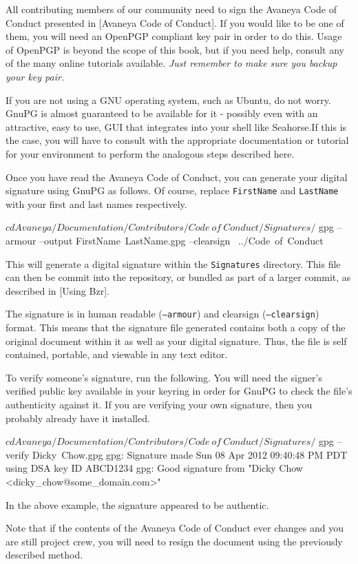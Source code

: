 

All contributing members of our community need to sign the Avaneya Code of Conduct presented in [Avaneya Code of Conduct]. If you would like to be one of them, you will need an OpenPGP compliant key pair in order to do this. Usage of OpenPGP is beyond the scope of this book, but if you need help, consult any of the many online tutorials available. {\it Just remember to make sure you backup your key pair.}

If you are not using a GNU operating system, such as Ubuntu, do not worry. GnuPG is almost guaranteed to be available for it - possibly even with an attractive, easy to use, GUI that integrates into your shell like Seahorse.\footnotecite[seahorse] If this is the case, you will have to consult with the appropriate documentation or tutorial for your environment to perform the analogous steps described here.

Once you have read the Avaneya Code of Conduct, you can generate your digital signature using GnuPG as follows. Of course, replace {\tt FirstName} and {\tt LastName} with your first and last names respectively.

\startCodeExample
$ cd Avaneya/Documentation/Contributors/Code\ of\ Conduct/Signatures/
$ gpg --armour --output FirstName\ LastName.gpg --clearsign \
    ../Code\ of\ Conduct
\stopCodeExample

This will generate a digital signature within the {\tt Signatures} directory. This file can then be commit into the repository, or bundled as part of a larger commit, as described in [Using Bzr]. 

The signature is in human readable ({\tt --armour}) and clearsign ({\tt --clearsign}) format. This means that the signature file generated contains both a copy of the original document within it as well as your digital signature. Thus, the file is self contained, portable, and viewable in any text editor.

To verify someone's signature, run the following. You will need the signer's verified public key available in your keyring in order for GnuPG to check the file's authenticity against it. If you are verifying your own signature, then you probably already have it installed.

\startCodeExample
$ cd Avaneya/Documentation/Contributors/Code\ of\ Conduct/Signatures/
$ gpg --verify Dicky\ Chow.gpg 
gpg: Signature made Sun 08 Apr 2012 09:40:48 PM PDT using DSA key ID ABCD1234
gpg: Good signature from "Dicky Chow <dicky_chow@some_domain.com>"
\stopCodeExample

In the above example, the signature appeared to be authentic.

Note that if the contents of the Avaneya Code of Conduct ever changes and you are still project crew, you will need to resign the document using the previously described method.

